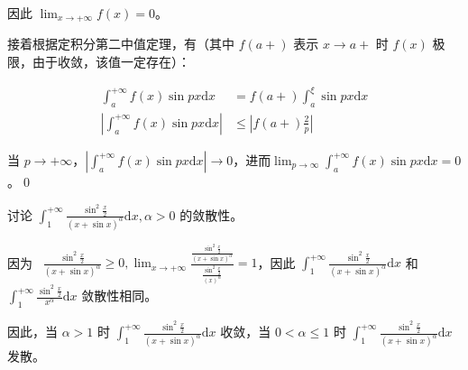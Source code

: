 因此 $\displaystyle \lim _{x\rightarrow +\infty } f( x) =0$。

接着根据定积分第二中值定理，有（其中 $\displaystyle f( a+)$ 表示 $\displaystyle x\rightarrow a+$ 时 $\displaystyle f( x)$ 极限，由于收敛，该值一定存在）：


\begin{align*}
	\int _{a}^{+\infty } f( x)\sin px\mathrm{d} x & =f( a+)\int _{a}^{\xi }\sin px\mathrm{d} x\\
	\left| \int _{a}^{+\infty } f( x)\sin px\mathrm{d} x\right|  & \leqslant \left| f( a+)\frac{2}{p}\right| 
\end{align*}

当 $\displaystyle p\rightarrow +\infty $，$\displaystyle \left| \int _{a}^{+\infty } f( x)\sin px\mathrm{d} x\right| \rightarrow 0$，进而$\displaystyle \lim _{p\rightarrow \infty }\int _{a}^{+\infty } f( x)\sin px\mathrm{d} x=0$。\qed 



\begin{ques}
	讨论 $\displaystyle \int _{1}^{+\infty }\frac{\sin^{2}\frac{x}{2}}{( x+\sin x)^{\alpha }}\mathrm{d} x,\alpha  >0$ 的敛散性。
\end{ques}



因为 \ $\displaystyle \frac{\sin^{2}\frac{x}{2}}{( x+\sin x)^{\alpha }} \geqslant 0,\lim _{x\rightarrow +\infty }\frac{\frac{\sin^{2}\frac{x}{2}}{( x+\sin x)^{\alpha }}}{\frac{\sin^{2}\frac{x}{2}}{( x)^{\alpha }}} =1$，因此 $\displaystyle \int _{1}^{+\infty }\frac{\sin^{2}\frac{x}{2}}{( x+\sin x)^{\alpha }}\mathrm{d} x$ 和$\displaystyle \int _{1}^{+\infty }\frac{\sin^{2}\frac{x}{2}}{x^{\alpha }}\mathrm{d} x$ 敛散性相同。

因此，当 $\displaystyle \alpha  >1$ 时 $ $$\displaystyle \int _{1}^{+\infty }\frac{\sin^{2}\frac{x}{2}}{( x+\sin x)^{\alpha }}\mathrm{d} x$ 收敛，当 $\displaystyle 0< \alpha \leqslant 1$ 时 $\displaystyle \int _{1}^{+\infty }\frac{\sin^{2}\frac{x}{2}}{( x+\sin x)^{\alpha }}\mathrm{d} x$ 发散。
\ifx\allfiles\undefined

\fi